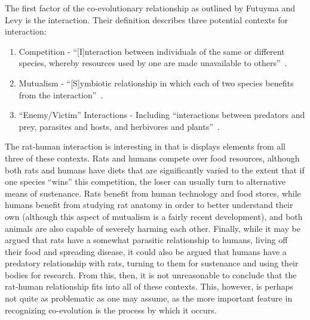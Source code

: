\documentclass[12pt]{article}
\begin{document}
The first factor of the co-evolutionary relationship as outlined by Futuyma and Levy is the interaction. Their definition describes three potential contexts for interaction:
\begin{enumerate}
\item Competition - ``[I]nteraction between individuals of the same or different species, whereby resources used by one are made unavailable to others''~\cite{FutuymaLevy2001}.
\item Mutualism - ``[S]ymbiotic relationship in which each of two species benefits from the interaction''~\cite{FutuymaLevy2001}.
\item ``Enemy/Victim'' Interactions - Including ``interactions between predators and prey, parasites and hosts, and herbivores and plants''~\cite{FutuymaLevy2001}.
\end{enumerate}
The rat-human interaction is interesting in that is displays elements from all three of these contexts. Rats and humans compete over food resources, although both rats and humans have diets that are significantly varied to the extent that if one species ``wins'' this competition, the loser can usually turn to alternative means of sustenance. Rats benefit from human technology and food stores, while humans benefit from studying rat anatomy in order to better understand their own (although this aspect of mutualism is a fairly recent development), and both animals are also capable of severely harming each other. Finally, while it may be argued that rats have a somewhat parasitic relationship to humans, living off their food and spreading disease, it could also be argued that humans have a predatory relationship with rats, turning to them for sustenance and using their bodies for research. From this, then, it is not unreasonable to conclude that the rat-human relationship fits into all of these contexts. This, however, is perhaps not quite as problematic as one may assume, as the more important feature in recognizing co-evolution is the process by which it occurs.
\end{document}
